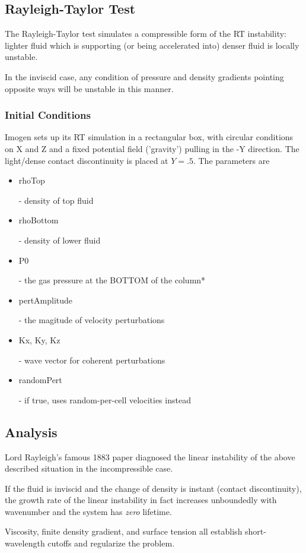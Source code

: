 
\subsection{Rayleigh-Taylor Test}

The Rayleigh-Taylor test simulates a compressible form of the RT instability: lighter fluid which is
supporting (or being accelerated into) denser fluid is locally unstable.

In the inviscid case, any condition of pressure and density gradients pointing opposite ways will be
unstable in this manner.

\subsubsection{Initial Conditions}

Imogen sets up its RT simulation in a rectangular box, with circular conditions on X and Z and a fixed
potential field ('gravity') pulling in the -Y direction. The light/dense contact discontinuity is placed
at $Y = .5$. The parameters are
\begin{itemize}
\item \begin{tt}rhoTop\end{tt} - density of top fluid
\item \begin{tt}rhoBottom\end{tt} - density of lower fluid
\item \begin{tt}P0\end{tt} - the gas pressure at the BOTTOM of the column*
\item \begin{tt}pertAmplitude\end{tt} - the magitude of velocity perturbations
\item \begin{tt}Kx, Ky, Kz\end{tt} - wave vector for coherent perturbations
\item \begin{tt}randomPert\end{tt} - if true, uses random-per-cell velocities instead
\end{itemize}

\subsection{Analysis}

Lord Rayleigh's famous 1883 paper diagnosed the linear instability of the above described situation in the
incompressible case.

If the fluid is inviscid and the change of density is instant (contact discontinuity), the growth rate of
the linear instability in fact increases unboundedly with wavenumber and the system has \textit{zero} lifetime.

Viscosity, finite density gradient, and surface tension all establish short-wavelength cutoffs and regularize
the problem.


